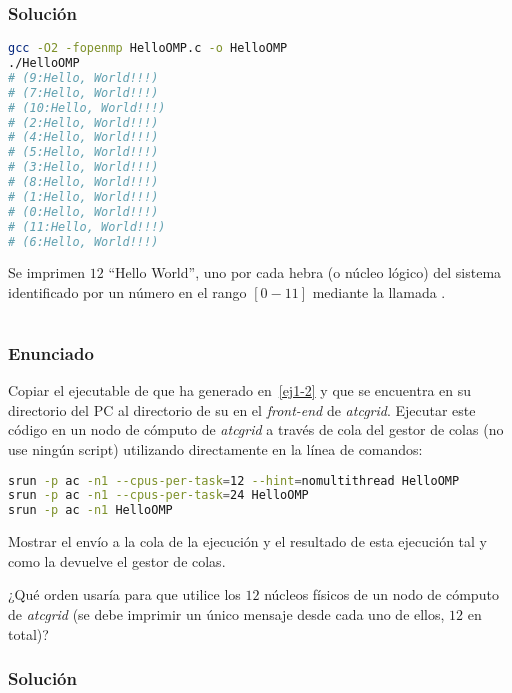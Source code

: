 \pagebreak

\subsubsection{Solución}

\begin{lstlisting}[language=sh]
gcc -O2 -fopenmp HelloOMP.c -o HelloOMP
./HelloOMP
# (9:Hello, World!!!)
# (7:Hello, World!!!)
# (10:Hello, World!!!)
# (2:Hello, World!!!)
# (4:Hello, World!!!)
# (5:Hello, World!!!)
# (3:Hello, World!!!)
# (8:Hello, World!!!)
# (1:Hello, World!!!)
# (0:Hello, World!!!)
# (11:Hello, World!!!)
# (6:Hello, World!!!)
\end{lstlisting}

Se imprimen $12$ ``Hello World'', uno por cada hebra (o núcleo lógico) del sistema identificado por un número en el rango $[0-11]$ mediante la llamada .

\section{}\label{ej1-3}

\subsubsection{Enunciado}

Copiar el ejecutable de  que ha generado en~\ref{ej1-2} y que se encuentra en su directorio del PC al directorio de su  en el \textit{front-end} de \textit{atcgrid}.
Ejecutar este código en un nodo de cómputo de \textit{atcgrid} a través de cola  del gestor de colas (no use ningún script) utilizando directamente en la línea de comandos:

\begin{lstlisting}[language=sh]
srun -p ac -n1 --cpus-per-task=12 --hint=nomultithread HelloOMP
srun -p ac -n1 --cpus-per-task=24 HelloOMP
srun -p ac -n1 HelloOMP
\end{lstlisting}

Mostrar el envío a la cola de la ejecución y el resultado de esta ejecución tal y como la devuelve el gestor de colas.

¿Qué orden  usaría para que  utilice los $12$ núcleos físicos de un nodo de cómputo de \textit{atcgrid} (se debe imprimir un único mensaje desde cada uno de ellos, $12$ en total)?

\subsubsection{Solución}

